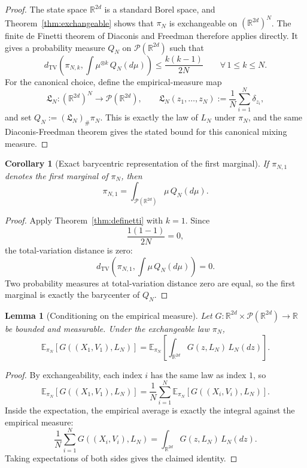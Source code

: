 \documentclass[11pt]{article}
\newtheorem{lemma}[theorem]{Lemma}
\newtheorem{corollary}[theorem]{Corollary}
\theoremstyle{definition}
\theoremstyle{remark}
\newcommand{\R}{\mathbb{R}}
\newcommand{\E}{\mathbb{E}}
\newcommand{\TV}{\mathrm{TV}}
\newcommand{\mcP}{\mathcal{P}}
\begin{document}
\begin{proof}
The state space $\R^{2d}$ is a standard Borel space, and
Theorem~\ref{thm:exchangeable} shows that $\pi_N$ is exchangeable on
$(\R^{2d})^N$. The finite de Finetti theorem of Diaconis and Freedman
\cite{diaconis1980finite} therefore applies directly. It gives a probability
measure $Q_N$ on $\mcP(\R^{2d})$ such that
\[
d_{\TV}\!\left(\pi_{N,k},\int\mu^{\otimes k}\,Q_N(d\mu)\right)
\leq
\frac{k(k-1)}{2N}
\qquad
\forall\,1\leq k\leq N.
\]
For the canonical choice, define the empirical-measure map
\[
\mathfrak L_N:(\R^{2d})^N\to \mcP(\R^{2d}),
\qquad
\mathfrak L_N(z_1,\dots,z_N):=\frac1N\sum_{i=1}^N \delta_{z_i},
\]
and set $Q_N:=(\mathfrak L_N)_\#\pi_N$. This is exactly the law of $L_N$ under
$\pi_N$, and the same Diaconis-Freedman theorem gives the stated bound for
this canonical mixing measure.
\end{proof}

\begin{corollary}[Exact barycentric representation of the first marginal]\label{cor:barycenter}
If $\pi_{N,1}$ denotes the first marginal of $\pi_N$, then
\[
\pi_{N,1}
=
\int_{\mcP(\R^{2d})}\mu\,Q_N(d\mu).
\]
\end{corollary}

\begin{proof}
Apply Theorem~\ref{thm:definetti} with \(k=1\). Since
\[
\frac{1(1-1)}{2N}=0,
\]
the total-variation distance is zero:
\[
d_{\TV}\!\left(\pi_{N,1},\int \mu\,Q_N(d\mu)\right)=0.
\]
Two probability measures at total-variation distance zero are equal, so the
first marginal is exactly the barycenter of \(Q_N\).
\end{proof}

\begin{lemma}[Conditioning on the empirical measure]\label{lem:emp-cond}
Let $G:\R^{2d}\times \mcP(\R^{2d})\to\R$ be bounded and measurable. Under the
exchangeable law $\pi_N$,
\[
\E_{\pi_N}[G((X_1,V_1),L_N)]
=
\E_{\pi_N}\!\left[\int_{\R^{2d}} G(z,L_N)\,L_N(dz)\right].
\]
\end{lemma}

\begin{proof}
By exchangeability, each index \(i\) has the same law as index \(1\), so
\[
\E_{\pi_N}[G((X_1,V_1),L_N)]
=
\frac1N\sum_{i=1}^N \E_{\pi_N}[G((X_i,V_i),L_N)].
\]
Inside the expectation, the empirical average is exactly the integral against
the empirical measure:
\[
\frac1N\sum_{i=1}^N G((X_i,V_i),L_N)
=
\int_{\R^{2d}} G(z,L_N)\,L_N(dz).
\]
Taking expectations of both sides gives the claimed identity.
\end{proof}
\end{document}
